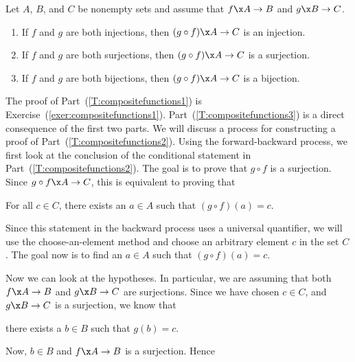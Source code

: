 \begin{theorem} \label{T:compositefunctions}
Let  $A$, $B$, and  $C$  be nonempty sets and assume that $f\x A \to B$ and 
$g\x B \to C$.

\begin{enumerate}
\item If  $f$  and  $g$  are both injections, then  $(g \circ f) \x A \to C$  is an injection. 
\label{T:compositefunctions1}

\item If  $f$  and  $g$  are both surjections, then  $(g \circ f) \x A \to C$  is a surjection. \label{T:compositefunctions2}

\item If  $f$  and  $g$  are both bijections, then  $(g \circ f) \x A \to C$  is a bijection. \label{T:compositefunctions3}
\end{enumerate}
\end{theorem}
%
The proof of Part~(\ref{T:compositefunctions1}) is Exercise~(\ref{exer:compositefunctions1}).   Part~(\ref{T:compositefunctions3}) is a direct consequence of the first two parts.  We will discuss a process for constructing a proof  of Part~(\ref{T:compositefunctions2}).  Using the forward-backward process, we first look at the conclusion of the conditional statement in Part~(\ref{T:compositefunctions2}).  The goal is to prove that  $g \circ f$  is a surjection.  Since  $g \circ f\x A \to C$, this is equivalent to proving that

\begin{center}
For all  $c \in C$, there exists an  $a \in A$  such that  
$( {g \circ f} )( a ) = c$.
\end{center}

Since this statement in the backward process uses a universal quantifier, we will use the choose-an-element method and choose an arbitrary element $c$ in the set $C$.  The goal now is to find an  $a \in A$  such that  
$( {g \circ f} )( a ) = c$.

Now we can look at the hypotheses.  In particular, we are assuming that both  $f\x A \to B$  and  $g\x B \to C$  are surjections.  Since  we have chosen  $c \in C$,  and  $g\x B \to C$  is a surjection, we know that

\begin{center}
there exists a  $b \in B$  such that  $g( b ) = c$.
\end{center}

\noindent
Now, $b \in B$  and   $f\x A \to B$  is a surjection.  Hence

